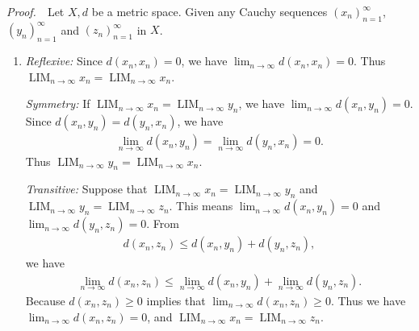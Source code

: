 \documentclass{book}
\DeclareMathOperator{\tlim}{LIM}%
\newcommand{\pff}{\vspace{.25em}\noindent\emph{Proof.}~~}
\begin{document}
\pff Let $X,d$ be a metric space. Given any Cauchy sequences $(x_n)_{n=1}^{\infty}$, $(y_n)_{n=1}^{\infty}$ and $(z_n)_{n=1}^{\infty}$ in $X$.
\begin{enumerate}
    \item \emph{Reflexive:} Since $d(x_n,x_n)=0$, we have $\lim_{n\to\infty}d(x_n,x_n)=0$. Thus $\tlim_{n\to\infty}x_n=\tlim_{n\to\infty}x_n$.
    
    \emph{Symmetry:} If $\tlim_{n\to\infty}x_n=\tlim_{n\to\infty}y_n$, we have $\lim_{n\to\infty}d(x_n,y_n)=0$. Since $d(x_n,y_n)=d(y_n,x_n)$, we have
        \begin{align*}
            \lim_{n\to\infty}d(x_n,y_n)=\lim_{n\to\infty}d(y_n,x_n)=0.
        \end{align*}
    Thus $\tlim_{n\to\infty}y_n=\tlim_{n\to\infty}x_n$.
    
    \emph{Transitive:} Suppose that $\tlim_{n\to\infty}x_n=\tlim_{n\to\infty}y_n$ and $\tlim_{n\to\infty}y_n=\tlim_{n\to\infty}z_n$. This means $\lim_{n\to\infty}d(x_n,y_n)=0$ and $\lim_{n\to\infty}d(y_n,z_n)=0$. From
        \begin{align*}
            d(x_n,z_n)\leq d(x_n,y_n)+d(y_n,z_n),
        \end{align*}
    we have
        \begin{align*}
            \lim_{n\to\infty}d(x_n,z_n)\leq\lim_{n\to\infty}d(x_n,y_n)+\lim_{n\to\infty}d(y_n,z_n).
        \end{align*}
    Because $d(x_n,z_n)\geq 0$ implies that $\lim_{n\to\infty}d(x_n,z_n)\geq 0$. Thus we have $\lim_{n\to\infty}d(x_n,z_n)=0$, and $\tlim_{n\to\infty}x_n=\tlim_{n\to\infty}z_n$.



\end{enumerate}
\end{document}

